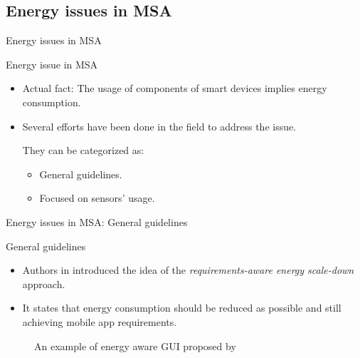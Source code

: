 \subsection{Energy issues in MSA}
\begin{frame}{Energy issues in MSA}
  \begin{block}{Energy issue in MSA }
    \begin{itemize}
      \item Actual fact: The usage of components of smart devices implies energy consumption.
      \item Several efforts have been done in the field to address the issue.
      
      They can be categorized as:
      \begin{itemize}
        \item General guidelines.
        \item Focused on sensors' usage.
      \end{itemize}
    \end{itemize}
  \end{block}
\end{frame}

\begin{frame}{Energy issues in MSA: General guidelines}
  \begin{block}{General guidelines}
    \begin{itemize}
      \item Authors in \citep{Mayo2004} introduced the idea of the \emph{requirements-aware energy scale-down} approach.
      \item It states that energy consumption should be reduced as possible and still achieving mobile app requirements.
    \end{itemize}
  \end{block}

  \begin{figure}
      \centering
      \caption{An example of energy aware GUI proposed by \protect\citep{Mayo2004}}
      \label{fig-scaling-down-screen-usage}
    \end{figure}
\end{frame}


